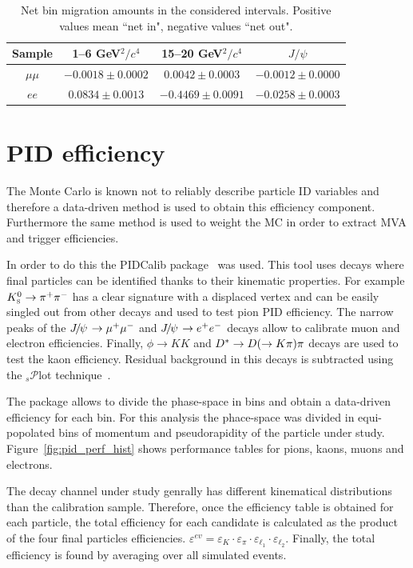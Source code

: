 \begin{table}[bh]
\label{tab:bin_mig}
\centering
\begin{tabular}{|c|c|c|c|}
\hline
 Sample 			& 1--6 GeV$^2/c^4$ 				& 15--20 GeV$^2/c^4$ 				& $J/\psi$  \\ \hline
$\mu\mu$ 	& $ -0.0018  \pm  0.0002 $ & $ 0.0042  \pm  0.0003 $ & $ -0.0012  \pm  0.0000 $ \\
$ee$ 	& $ 0.0834  \pm  0.0013 $ & $ -0.4469  \pm  0.0091 $ & $ -0.0258  \pm  0.0003 $ \\
\hline 
 \end{tabular}
\caption{Net bin migration amounts in the considered \qsq intervals.
Positive values mean ``net in", negative values ``net out".}
\end{table}

\section{PID efficiency}
\label{sec:RKst_pid_eff}

The Monte Carlo is known not to reliably describe particle ID variables
and therefore a data-driven method is used to obtain this efficiency component.
Furthermore the same method is used to weight the MC in order to extract MVA and trigger efficiencies.

In order to do this the PIDCalib package~\cite{Aaij:1978280} was used. This tool uses decays where final 
particles can be identified thanks to their kinematic properties.
For example $\KS\to\pi^+\pi^-$ has a clear signature with a displaced vertex
and can be easily singled out from other decays and used to test pion PID efficiency.
The narrow peaks of the $\jpsi\to\mumu$ and $\jpsi\to\ee$ decays allow to calibrate
muon and electron efficiencies. Finally, $\phi\to KK$ and $\D^*\to D(\to K\pi)\pi$ decays
are used to test the kaon efficiency. Residual background in this decays is subtracted using
the $_s\mathcal{P}$lot technique~\cite{sPlot}.

The package allows to divide the phase-space in bins and obtain a data-driven efficiency for each bin.
For this analysis the phace-space was divided in equi-popolated bins of momentum
and pseudorapidity of the particle under study. Figure~\ref{fig:pid_perf_hist} shows performance
tables for pions, kaons, muons and electrons.

The decay channel under study genrally has different kinematical distributions than the calibration sample.
Therefore, once the efficiency table is obtained for each particle, the total efficiency for each candidate
is calculated as the product of the four final particles efficiencies.
$\varepsilon^{ev} = \varepsilon_K\cdot\varepsilon_\pi\cdot\varepsilon_{\ell_1}\cdot\varepsilon_{\ell_2}$.
Finally, the total efficiency is found by averaging over all simulated events.

